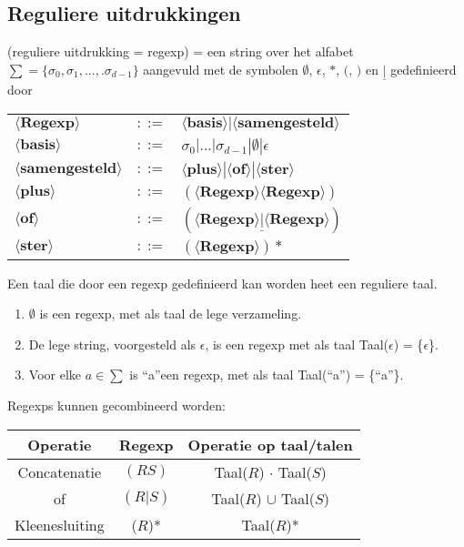 \documentclass{report}
\begin{document}
\subsection{Reguliere uitdrukkingen}
(reguliere uitdrukking = regexp) = een string over het alfabet $\sum = \{\sigma_0, \sigma_1, ..., .\sigma_{d - 1}\}$ aangevuld met de symbolen $\emptyset$, $\epsilon$, $*$, $($, $)$ en $\underline{|}$ gedefinieerd door
\begin{table}[ht]
	\centering
	\begin{tabular}{l l l}
		$\langle \textbf{Regexp} \rangle$ & $::=$ & $\langle \textbf{basis} \rangle | \langle \textbf{samengesteld} \rangle$ \\
		$\langle \textbf{basis} \rangle$ & $::=$ & $\sigma_0 | ... | \sigma_{d - 1} | \emptyset | \epsilon$ \\
		$\langle \textbf{samengesteld} \rangle$ & $::=$ & $\langle \textbf{plus} \rangle  |  \langle \textbf{of} \rangle | \langle \textbf{ster} \rangle$ \\
		$\langle \textbf{plus} \rangle $ & $::=$ & $(\langle \textbf{Regexp} \rangle \langle \textbf{Regexp} \rangle)$ \\
		$\langle \textbf{of} \rangle $ & $::=$ & $(\langle \textbf{Regexp} \rangle \underline{|} \langle \textbf{Regexp} \rangle)$ \\
		$\langle \textbf{ster} \rangle $ & $::=$ & $(\langle \textbf{Regexp} \rangle)*$
	\end{tabular}
\end{table}
Een taal die door een regexp gedefinieerd kan worden heet een reguliere taal. 
\begin{enumerate}
	\item $\emptyset$ is een regexp, met als taal de lege verzameling.
	\item De lege string, voorgesteld als $\epsilon$, is een regexp met als taal Taal($\epsilon$) = \{$\epsilon$\}.
	\item Voor elke $a \in \sum$ is \textquotedblleft a\textquotedblright een regexp, met als taal Taal(\textquotedblleft a\textquotedblright ) = \{\textquotedblleft a\textquotedblright\}.
\end{enumerate}
Regexps kunnen gecombineerd worden:
\begin{table}[h]
	\centering
	\begin{tabular}{c c c }
		\hline
		Operatie & Regexp & Operatie op taal/talen \\
		\hline 
		Concatenatie & $(RS)$ & Taal($R$) $\cdot$ Taal($S$) \\
		of & $(R|S)$ & Taal($R$) $\cup$ Taal($S$)  \\
		Kleenesluiting & ($R$)* & Taal($R$)*
		 
	\end{tabular}
\end{table}
\end{document}
